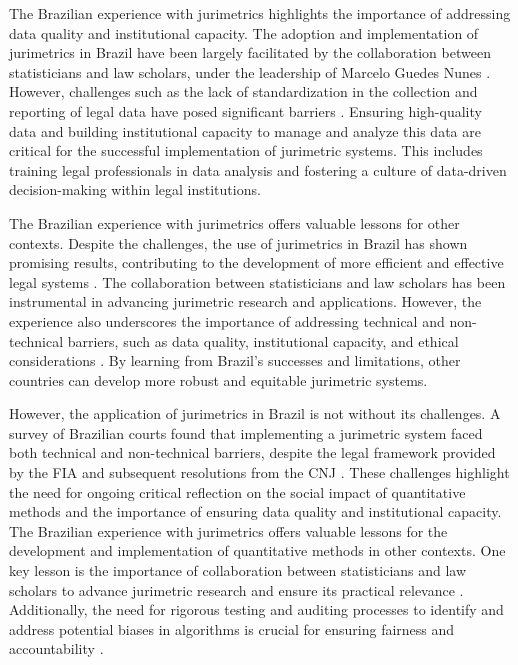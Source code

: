 The Brazilian experience with jurimetrics highlights the importance of addressing data quality and institutional capacity. The adoption and implementation of jurimetrics in Brazil have been largely facilitated by the collaboration between statisticians and law scholars, under the leadership of Marcelo Guedes Nunes \cite{10.1007/s11186-021-09453-1,10.3390/fi9040068}. However, challenges such as the lack of standardization in the collection and reporting of legal data have posed significant barriers \cite{10.1007/s11186-021-09453-1,10.5040/9781350220645}. Ensuring high-quality data and building institutional capacity to manage and analyze this data are critical for the successful implementation of jurimetric systems. This includes training legal professionals in data analysis and fostering a culture of data-driven decision-making within legal institutions.

The Brazilian experience with jurimetrics offers valuable lessons for other contexts. Despite the challenges, the use of jurimetrics in Brazil has shown promising results, contributing to the development of more efficient and effective legal systems \cite{10.1007/s11186-021-09453-1,10.5040/9781350220645}. The collaboration between statisticians and law scholars has been instrumental in advancing jurimetric research and applications. However, the experience also underscores the importance of addressing technical and non-technical barriers, such as data quality, institutional capacity, and ethical considerations \cite{10.1007/s11186-021-09453-1,10.5040/9781350220645}. By learning from Brazil's successes and limitations, other countries can develop more robust and equitable jurimetric systems.

However, the application of jurimetrics in Brazil is not without its challenges. A survey of Brazilian courts found that implementing a jurimetric system faced both technical and non-technical barriers, despite the legal framework provided by the FIA and subsequent resolutions from the CNJ \cite{10.1007/s11186-021-09453-1,international2015,10.3390/fi9040068}. These challenges highlight the need for ongoing critical reflection on the social impact of quantitative methods and the importance of ensuring data quality and institutional capacity. The Brazilian experience with jurimetrics offers valuable lessons for the development and implementation of quantitative methods in other contexts. One key lesson is the importance of collaboration between statisticians and law scholars to advance jurimetric research and ensure its practical relevance \cite{10.1007/s11186-021-09453-1,10.3390/fi9040068}. Additionally, the need for rigorous testing and auditing processes to identify and address potential biases in algorithms is crucial for ensuring fairness and accountability \cite{10.1590/data.2022.65.3.267,10.1007/978-3-319-44000-2_15}.


